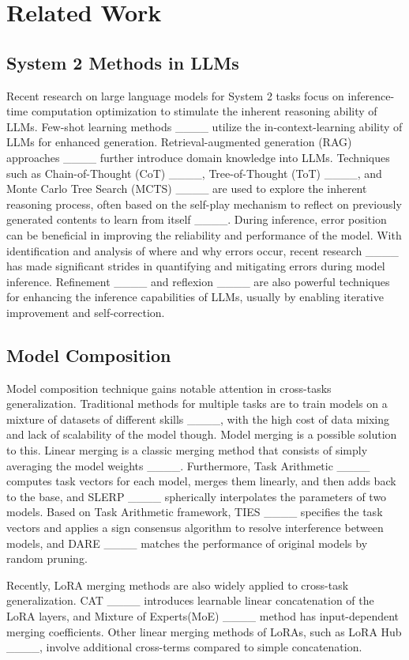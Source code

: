 \section{Related Work}
\subsection{System 2 Methods in LLMs}
Recent research on large language models for System 2 tasks focus on inference-time computation optimization to stimulate the inherent reasoning ability of LLMs. Few-shot learning methods ____ utilize the in-context-learning ability of LLMs for enhanced generation. Retrieval-augmented generation (RAG) approaches ____ further introduce domain knowledge into LLMs. 
Techniques such as Chain-of-Thought (CoT) ____, Tree-of-Thought (ToT) ____, and Monte Carlo Tree Search (MCTS) ____ are used to explore the inherent reasoning process, often based on the self-play mechanism to reflect on previously generated contents to learn from itself ____.
During inference, error position can be beneficial in improving the reliability and performance of the model. With identification and analysis of where and why errors occur, recent research ____ has made significant strides in quantifying and mitigating errors during model inference. Refinement ____ and reflexion ____ are also powerful techniques for enhancing the inference capabilities of LLMs, usually by enabling iterative improvement and self-correction.

\subsection{Model Composition}
Model composition technique gains notable attention in cross-tasks generalization. 
Traditional methods for multiple tasks are to train models on a mixture of datasets of different skills ____, with the high cost of data mixing and lack of scalability of the model though. Model merging is a possible solution to this. Linear merging is a classic merging method that consists of simply averaging the model weights ____. Furthermore, Task Arithmetic ____ computes task vectors for each model, merges them linearly, and then adds back to the base, and SLERP ____ spherically interpolates the parameters of two models. Based on Task Arithmetic framework, TIES ____ specifies the task vectors and applies a sign consensus algorithm to resolve interference between models, and DARE ____ matches the performance of original models by random pruning.

Recently, LoRA merging methods are also widely applied to cross-task generalization. CAT ____ introduces learnable linear concatenation of the LoRA layers, and Mixture of Experts(MoE) ____ method has input-dependent merging coefficients. Other linear merging methods of LoRAs, such as LoRA Hub ____, involve additional cross-terms compared to simple concatenation. %